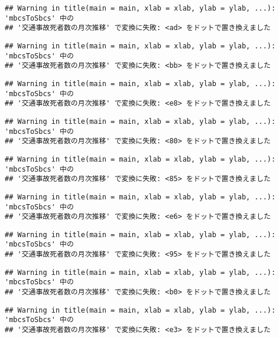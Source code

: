 \documentclass[]{article}
\begin{document}
\begin{verbatim}
## Warning in title(main = main, xlab = xlab, ylab = ylab, ...): 'mbcsToSbcs' 中の
## '交通事故死者数の月次推移' で変換に失敗: <ad> をドットで置き換えました
\end{verbatim}

\begin{verbatim}
## Warning in title(main = main, xlab = xlab, ylab = ylab, ...): 'mbcsToSbcs' 中の
## '交通事故死者数の月次推移' で変換に失敗: <bb> をドットで置き換えました
\end{verbatim}

\begin{verbatim}
## Warning in title(main = main, xlab = xlab, ylab = ylab, ...): 'mbcsToSbcs' 中の
## '交通事故死者数の月次推移' で変換に失敗: <e8> をドットで置き換えました
\end{verbatim}

\begin{verbatim}
## Warning in title(main = main, xlab = xlab, ylab = ylab, ...): 'mbcsToSbcs' 中の
## '交通事故死者数の月次推移' で変換に失敗: <80> をドットで置き換えました
\end{verbatim}

\begin{verbatim}
## Warning in title(main = main, xlab = xlab, ylab = ylab, ...): 'mbcsToSbcs' 中の
## '交通事故死者数の月次推移' で変換に失敗: <85> をドットで置き換えました
\end{verbatim}

\begin{verbatim}
## Warning in title(main = main, xlab = xlab, ylab = ylab, ...): 'mbcsToSbcs' 中の
## '交通事故死者数の月次推移' で変換に失敗: <e6> をドットで置き換えました
\end{verbatim}

\begin{verbatim}
## Warning in title(main = main, xlab = xlab, ylab = ylab, ...): 'mbcsToSbcs' 中の
## '交通事故死者数の月次推移' で変換に失敗: <95> をドットで置き換えました
\end{verbatim}

\begin{verbatim}
## Warning in title(main = main, xlab = xlab, ylab = ylab, ...): 'mbcsToSbcs' 中の
## '交通事故死者数の月次推移' で変換に失敗: <b0> をドットで置き換えました
\end{verbatim}

\begin{verbatim}
## Warning in title(main = main, xlab = xlab, ylab = ylab, ...): 'mbcsToSbcs' 中の
## '交通事故死者数の月次推移' で変換に失敗: <e3> をドットで置き換えました
\end{verbatim}
\end{document}
